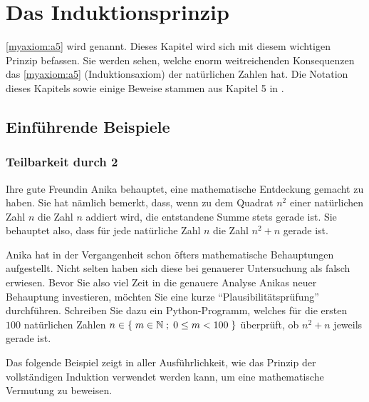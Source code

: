 \chapter{Das Induktionsprinzip}\label{ch:Kapitel02}

\cref{myaxiom:a5} wird  genannt. Dieses Kapitel wird sich mit diesem wichtigen Prinzip befassen.
Sie werden sehen, welche enorm weitreichenden Konsequenzen das \cref{myaxiom:a5} (Induktionsaxiom) der natürlichen Zahlen hat. Die Notation dieses Kapitels sowie einige Beweise stammen aus Kapitel 5 in \cite{AmannEscher1}.

\section{Einführende Beispiele}

\subsection{Teilbarkeit durch 2}
Ihre gute Freundin Anika behauptet, eine mathematische Entdeckung gemacht zu haben. Sie hat nämlich bemerkt, dass, wenn zu dem Quadrat $n^2$ einer natürlichen Zahl $n$ die Zahl $n$ addiert wird, die entstandene Summe stets gerade ist. Sie behauptet also, dass für jede natürliche Zahl $n$ die Zahl $n^2+n$ gerade ist.

\begin{myexercise}\label{myexercise:0200}
	Anika hat in der Vergangenheit schon öfters mathematische Behauptungen aufgestellt. Nicht selten haben sich diese bei genauerer Untersuchung als falsch erwiesen. Bevor Sie also viel Zeit in die genauere Analyse Anikas neuer Behauptung investieren, möchten Sie eine kurze \enquote{Plausibilitätsprüfung} durchführen. Schreiben Sie dazu ein Python-Programm, welches für die ersten $100$ natürlichen Zahlen $n\in\left\{\;m\in\mathbb{N} \; ; \; 0\leq m < 100 \;\right\}$ überprüft, ob $n^2+n$ jeweils gerade ist.
\end{myexercise}
\noindent
Das folgende Beispiel zeigt in aller Ausführlichkeit, wie das Prinzip der vollständigen Induktion verwendet werden kann, um eine mathematische Vermutung zu beweisen.

